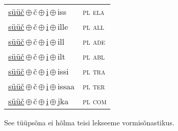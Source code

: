\begin{minipage}{\textwidth}
\begin{sideways}
\begin{tabular}{l l}
\underline{süüč}\,$\oplus$\,č\,$\oplus$\,\underline{i}\,$\oplus$\,iss & \textsc{ pl ela } \\
\underline{süüč}\,$\oplus$\,č\,$\oplus$\,\underline{i}\,$\oplus$\,ille & \textsc{ pl all } \\
\underline{süüč}\,$\oplus$\,č\,$\oplus$\,\underline{i}\,$\oplus$\,ill & \textsc{ pl ade } \\
\underline{süüč}\,$\oplus$\,č\,$\oplus$\,\underline{i}\,$\oplus$\,ilt & \textsc{ pl abl } \\
\underline{süüč}\,$\oplus$\,č\,$\oplus$\,\underline{i}\,$\oplus$\,issi & \textsc{ pl tra } \\
\underline{süüč}\,$\oplus$\,č\,$\oplus$\,\underline{i}\,$\oplus$\,issaa & \textsc{ pl ter } \\
\underline{süüč}\,$\oplus$\,č\,$\oplus$\,\underline{i}\,$\oplus$\,jka & \textsc{ pl com } \\
\end{tabular}
\end{sideways}
\label{tab:tüüpsõnamall-süüčči}

\end{minipage}

 
\vspace{1em}
\noindent See tüüpsõna ei hõlma teisi lekseeme vormi\-sõnastikus.
